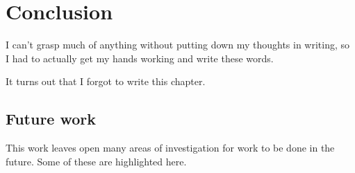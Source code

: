 
\chapter{Conclusion}

\epigraph{
  I can't grasp much of anything without putting down my thoughts in writing, so I had to actually get my hands working and write these words.
}{\textcite{murakami2008}}

It turns out that I forgot to write this chapter.

\section{Future work}

This work leaves open many areas of investigation for work to be done in the future.
Some of these are highlighted here.

